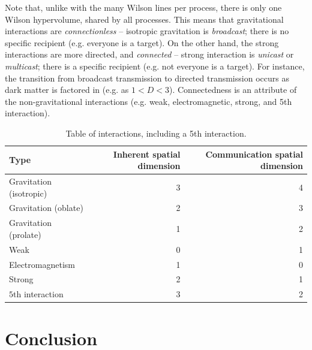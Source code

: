\documentclass[12pt]{article}
\begin{document}
Note that, unlike with the many Wilson lines per process, there is only one Wilson hypervolume, shared by all processes.
This means that gravitational interactions are {\textit{connectionless}} -- isotropic gravitation is {\textit{broadcast}}; there is no specific recipient (e.g. everyone is a target).
On the other hand, the strong interactions are more directed, and {\textit{connected}} -- strong interaction is {\textit{unicast}} or {\textit{multicast}}; there is a specific recipient (e.g. not everyone is a target).
For instance, the transition from broadcast transmission to directed transmission occurs as dark matter is factored in (e.g. as $1 < D < 3$).
Connectedness is an attribute of the non-gravitational interactions (e.g. weak, electromagnetic, strong, and 5th interaction).




\begin{table}
\caption{Table of interactions, including a 5th interaction.}
\begin{center}
\begin{tabular}{| l | r | r |}
  \hline
  Type & Inherent spatial dimension & Communication spatial dimension \\
\hline
\hline


Gravitation (isotropic) & 3  & 4\\

\rowcolor{Gray}
Gravitation (oblate) & 2 & 3\\

Gravitation (prolate) & 1 & 2\\

\rowcolor{Gray}
Weak & 0 & 1\\

Electromagnetism & 1 & 0 \\

\rowcolor{Gray}
Strong & 2 & 1\\

$5$th interaction & 3 & 2 \\
  \hline
\end{tabular}
\end{center}
\end{table}




\section{Conclusion}
\end{document}
